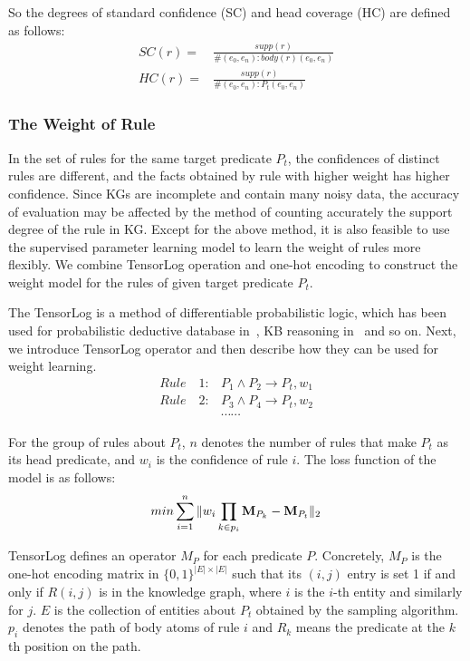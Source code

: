 \documentclass{article}
\begin{document}
	So the degrees of standard confidence
(SC) and head coverage (HC) are defined as follows: 
	\begin{align}
		SC(r) =& \frac{supp(r)}{\#(e_0, e_n):body(r)(e_0, e_n)}\\
		HC(r) =& \frac{supp(r)}{\#(e_0, e_n):P_t( e_0, e_n)}
	\end{align}
	
	\subsubsection{The Weight of Rule}  
	In the set of rules for the same target predicate $P_t$, the confidences of distinct rules are different, and the facts obtained by rule with higher weight has higher confidence. Since KGs are incomplete and contain many noisy data, the accuracy of evaluation may be affected by the method of counting accurately the support degree of the rule in KG. Except for the above method, it is also feasible to use the supervised parameter learning model to learn the weight of rules more flexibly. We combine TensorLog operation and one-hot encoding to construct the weight model for the rules of given target predicate $P_t$.
	
	The TensorLog is a method of differentiable probabilistic logic, which has been used for
	probabilistic deductive database in~\cite{Cohen:TensorLog}, KB reasoning in~\cite{Yang:NeuralLP} and so on. Next, we introduce TensorLog operator and then describe how they can be used for weight learning. 
	\begin{align}
		Rule\quad 1: &P_1 \land P_2 \to P_t, w_1\nonumber\\
		Rule\quad 2: &P_3 \land P_4 \to P_t, w_2\nonumber\\
		&\cdots \cdots \nonumber
	\end{align}
	
	For the group of rules about $P_t$, $n$ denotes the number of rules that make $P_t$ as its head predicate, and $w_i$ is the confidence of rule $i$. The loss function of the model is as follows:
	\begin{equation}
		min\sum_{i=1}^{n}\Vert w_i\prod_{k\in p_i}{\bf M}_{P_k}-{\bf M}_{P_t}\Vert_2
		\label{eq:weight model}
	\end{equation}
	
	TensorLog defines an operator $M_P$ for each predicate $P$. Concretely, $M_P$ is the one-hot encoding matrix in $\{0,1\}^{|E| \times|E|}$ such that its $(i,j)$ entry is set 1 if and only if $R(i, j)$ is in the knowledge graph, where $i$ is the $i$-th entity and similarly for $j$. $E$ is the collection of entities about $P_t$ obtained by the sampling algorithm. $p_i$ denotes the path of body atoms of rule $i$ and $R_k$ means the predicate at the $k$th position on the path.
	
\end{document}
